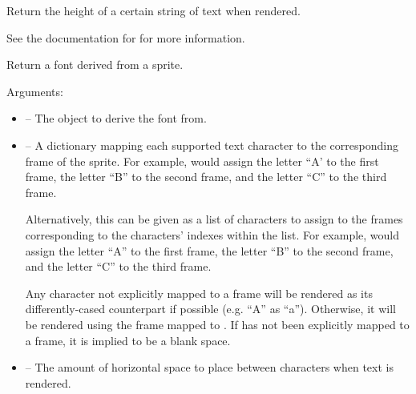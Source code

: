 \documentclass[letterpaper,10pt,english]{sphinxmanual}
\begin{document}

\begin{fulllineitems}
\label{gfx:sge.gfx.Font.get_height}
Return the height of a certain string of text when rendered.

See the documentation for {\hyperref[gfx:sge.gfx.Sprite.draw_text]{\emph{}}} for
more information.

\end{fulllineitems}


\begin{fulllineitems}
\label{gfx:sge.gfx.Font.from_sprite}
Return a font derived from a sprite.

Arguments:
\begin{itemize}
\item {} 
 -- The {\hyperref[gfx:sge.gfx.Sprite]{\emph{}}} object to derive the
font from.

\item {} 
 -- A dictionary mapping each supported text
character to the corresponding frame of the sprite.  For
example,  would assign the letter
``A' to the first frame, the letter ``B'' to the second frame,
and the letter ``C'' to the third frame.

Alternatively, this can be given as a list of characters to
assign to the frames corresponding to the characters' indexes
within the list.  For example, \code{{[}'A', 'B', 'C'{]}} would
assign the letter ``A'' to the first frame, the letter ``B'' to
the second frame, and the letter ``C'' to the third frame.

Any character not explicitly mapped to a frame will be
rendered as its differently-cased counterpart if possible
(e.g. ``A'' as ``a''). Otherwise, it will be rendered using the
frame mapped to .  If  has not been
explicitly mapped to a frame, it is implied to be a blank
space.

\item {} 
 -- The amount of horizontal space to place between
characters when text is rendered.


\end{itemize}
\end{fulllineitems}
\end{document}
